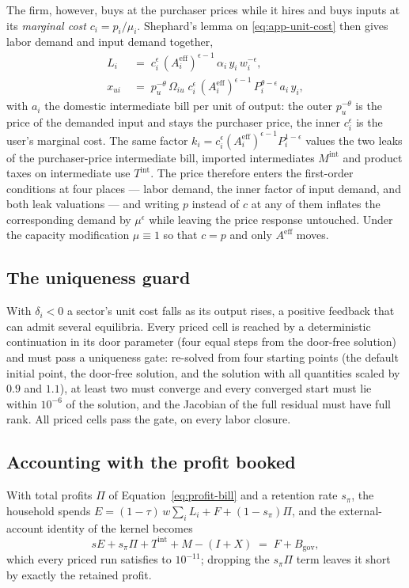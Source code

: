 The firm, however, buys at the purchaser prices while it hires and buys inputs at
its \emph{marginal cost} $c_i = p_i/\mu_i$. Shephard's lemma on
\eqref{eq:app-unit-cost} then gives labor demand and input demand together,
\begin{align}
  L_i \;&=\; c_i^{\epsilon}\,(A^{\mathrm{eff}}_i)^{\epsilon-1}\,\alpha_i\,y_i\,w_i^{-\epsilon},
  \label{eq:app-labour}\\
  x_{ui} \;&=\; p_u^{-\theta}\,\Omega_{iu}\;c_i^{\epsilon}\,
     (A^{\mathrm{eff}}_i)^{\epsilon-1}\,P_i^{\theta-\epsilon}\,a_i\,y_i ,
  \label{eq:app-intermediate}
\end{align}
with $a_i$ the domestic intermediate bill per unit of output: the outer
$p_u^{-\theta}$ is the price of the demanded input and stays the purchaser price,
the inner $c_i^{\epsilon}$ is the user's marginal cost. The same factor
$k_i = c_i^{\epsilon}(A^{\mathrm{eff}}_i)^{\epsilon-1}P_i^{1-\epsilon}$ values the
two leaks of the purchaser-price intermediate bill, imported intermediates
$M^{\mathrm{int}}$ and product taxes on intermediate use $T^{\mathrm{int}}$. The
price therefore enters the first-order conditions at four places --- labor demand,
the inner factor of input demand, and both leak valuations --- and writing $p$
instead of $c$ at any of them inflates the corresponding demand by
$\mu^{\epsilon}$ while leaving the price response untouched. Under the capacity
modification $\mu \equiv 1$ so that $c = p$ and only $A^{\mathrm{eff}}$ moves.

\subsection{The uniqueness guard}\label{app:pricing-guard}
With $\delta_i < 0$ a sector's unit cost falls as its output rises, a positive
feedback that can admit several equilibria. Every priced cell is reached by a
deterministic continuation in its door parameter (four equal steps from the
door-free solution) and must pass a uniqueness gate: re-solved from four
starting points (the default initial point, the door-free solution, and the
solution with all quantities scaled by $0.9$ and $1.1$), at least two must
converge and every converged start must lie within $10^{-6}$ of the solution,
and the Jacobian of the full residual must have full rank. All priced cells pass the gate, on every labor closure.

\subsection{Accounting with the profit booked}\label{app:pricing-accounting}
With total profits $\Pi$ of Equation~\eqref{eq:profit-bill} and a retention rate
$s_\pi$, the household spends $E = (1-\tau)\,w\textstyle\sum_i L_i + F + (1-s_\pi)\Pi$, and the external-account identity of the kernel becomes
\begin{equation}\label{eq:app-account}
  sE + s_\pi \Pi + T^{\mathrm{int}} + M - (I + X) \;=\; F + B_{\mathrm{gov}},
\end{equation}
which every priced run satisfies to $10^{-11}$; dropping the $s_\pi\Pi$ term leaves it
short by exactly the retained profit.

